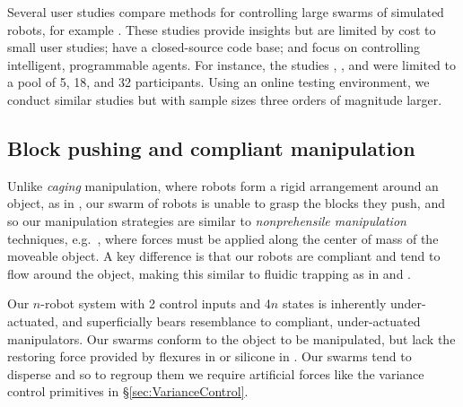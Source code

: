 


Several user studies compare methods for controlling large swarms of simulated robots, for example \cite{bashyal2008human,kolling2012towards,de2012controllability}.  These studies provide insights but are limited by cost to small user studies; have a closed-source code base; and focus on controlling intelligent, programmable agents.  
For instance, the studies \cite{bashyal2008human},  \cite{de2012controllability}, and \cite{kolling2012towards}  were limited to a pool of 5, 18, and 32  participants.
	Using an online testing environment, we conduct similar studies but with sample sizes three orders of magnitude larger.

\subsection{Block pushing and compliant manipulation}
Unlike \emph{caging} manipulation, where robots form a rigid arrangement around an object, as in \cite{Sudsang2002,Fink2008}, our swarm of robots is unable to grasp the blocks they push, and so our manipulation strategies are similar to \emph{nonprehensile manipulation} techniques, e.g.~\cite{Lynch1999}, where forces must be applied along the center of mass of the moveable object. A key difference is that our robots are compliant and tend to flow around the object, making this similar to fluidic trapping as in \cite{Armani2006} and \cite{Becker2009}.  

Our $n$-robot system with 2 control inputs and 4$n$ states is inherently under-actuated, and superficially bears resemblance to compliant, under-actuated manipulators.  Our swarms conform to the object to be manipulated, but lack the restoring force provided by flexures in \cite{odhner2014compliant} or silicone in \cite{deimel2014novel}.  Our swarms tend to disperse and so to regroup them we require artificial forces like the variance control primitives in \S \ref{sec:VarianceControl}.
 

